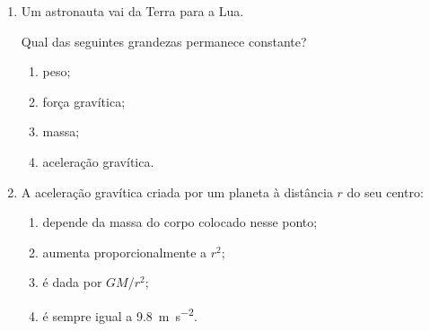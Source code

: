 \documentclass[11pt,a4paper]{article}
\begin{document}
\begin{enumerate}[label=\textbf{\arabic*.},resume]
		\begin{enumerate}[label=\Alph*.]
			
			\item intensidades diferentes porque as massas são diferentes;
			
			\item a mesma direção, o mesmo sentido e diferentes intensidades;
			
			\item a mesma intensidade e sentidos opostos;
			
			\item intensidades e direções diferentes.
			
		\end{enumerate}
		
		\item Um astronauta vai da Terra para a Lua.
		
		Qual das seguintes grandezas permanece constante?
		
		\begin{enumerate}[label=\Alph*.]
			
			\item peso;
			
			\item força gravítica;
			
			\item massa;
			
			\item aceleração gravítica.
			
		\end{enumerate}
		
		\item A aceleração gravítica criada por um planeta à distância $r$ do seu
		centro:
		
		\begin{enumerate}[label=\Alph*.]
			
			\item depende da massa do corpo colocado nesse ponto;
			
			\item aumenta proporcionalmente a $r^2$;
			
			\item é dada por $GM/r^2$;
			
			\item é sempre igual a \SI{9.8}{\metre\per\second\squared}.
			
		\end{enumerate}
		
	\end{enumerate}
	
\end{document}
